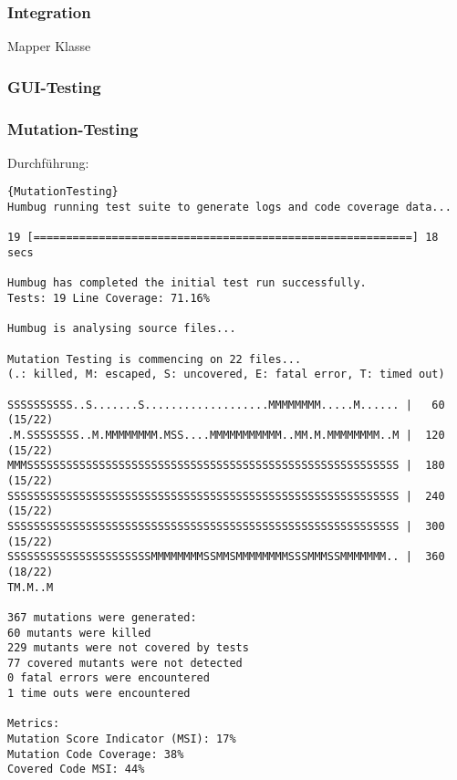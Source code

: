 



\subsubsection{Integration}

Mapper Klasse



\subsubsection{GUI-Testing}

\subsubsection{Mutation-Testing}

Durchführung:
\begin{lstlisting}[caption=Ausführung des Mutation-Testing]{MutationTesting}
Humbug running test suite to generate logs and code coverage data...

19 [==========================================================] 18 secs

Humbug has completed the initial test run successfully.
Tests: 19 Line Coverage: 71.16%

Humbug is analysing source files...

Mutation Testing is commencing on 22 files...
(.: killed, M: escaped, S: uncovered, E: fatal error, T: timed out)

SSSSSSSSSS..S.......S...................MMMMMMMM.....M...... |   60 (15/22)
.M.SSSSSSSS..M.MMMMMMMM.MSS....MMMMMMMMMMM..MM.M.MMMMMMMM..M |  120 (15/22)
MMMSSSSSSSSSSSSSSSSSSSSSSSSSSSSSSSSSSSSSSSSSSSSSSSSSSSSSSSSS |  180 (15/22)
SSSSSSSSSSSSSSSSSSSSSSSSSSSSSSSSSSSSSSSSSSSSSSSSSSSSSSSSSSSS |  240 (15/22)
SSSSSSSSSSSSSSSSSSSSSSSSSSSSSSSSSSSSSSSSSSSSSSSSSSSSSSSSSSSS |  300 (15/22)
SSSSSSSSSSSSSSSSSSSSSSMMMMMMMMSSMMSMMMMMMMMSSSMMMSSMMMMMMM.. |  360 (18/22)
TM.M..M

367 mutations were generated:
60 mutants were killed
229 mutants were not covered by tests
77 covered mutants were not detected
0 fatal errors were encountered
1 time outs were encountered

Metrics:
Mutation Score Indicator (MSI): 17%
Mutation Code Coverage: 38%
Covered Code MSI: 44%
\end{lstlisting}



